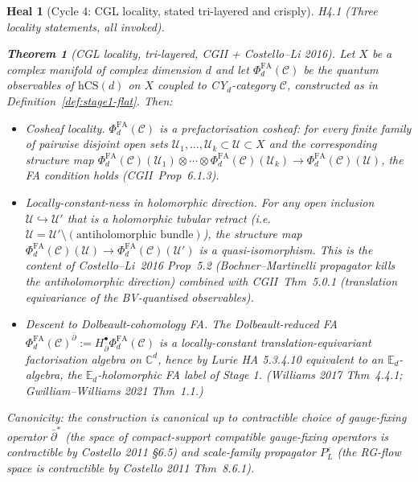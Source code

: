 \documentclass[11pt]{article}
\newtheorem{theorem}{Theorem}
\newtheorem*{heal}{Heal}
\theoremstyle{definition}
\providecommand{\CC}{\mathbb{C}}
\providecommand{\cC}{\mathcal{C}}
\providecommand{\cU}{\mathcal{U}}
\providecommand{\hCS}{\mathrm{hCS}}
\providecommand{\FA}{\mathrm{FA}}
\begin{document}
\begin{heal}[Cycle 4: CGL locality, stated tri-layered and crisply]

\emph{H4.1 (Three locality statements, all invoked).}

\begin{theorem}[CGL locality, tri-layered, CGII + Costello--Li 2016]
\label{thm:cgl-locality}
Let $X$ be a complex manifold of complex dimension $d$ and let
$\Phi^{\FA}_d(\cC)$ be the quantum observables of $\hCS(d)$ on $X$
coupled to CY$_d$-category $\cC$, constructed as in
Definition~\ref{def:stage1-flat}. Then:
\begin{itemize}[leftmargin=2em]
  \item[(L1)] \emph{Cosheaf locality.} $\Phi^{\FA}_d(\cC)$ is a
              prefactorisation cosheaf: for every finite family of
              pairwise disjoint open sets
              $\cU_1,\ldots,\cU_k\subset\cU\subset X$ and the
              corresponding structure map
              $\Phi^{\FA}_d(\cC)(\cU_1) \otimes \cdots \otimes \Phi^{\FA}_d(\cC)(\cU_k)
              \to \Phi^{\FA}_d(\cC)(\cU)$, the FA condition holds
              (CGII~Prop~6.1.3).
  \item[(L2)] \emph{Locally-constant-ness in holomorphic direction.}
              For any open inclusion $\cU\hookrightarrow\cU'$ that is a
              holomorphic tubular retract (i.e.\ $\cU = \cU'\setminus
              (\text{antiholomorphic bundle})$), the structure map
              $\Phi^{\FA}_d(\cC)(\cU) \to \Phi^{\FA}_d(\cC)(\cU')$ is a
              quasi-isomorphism. This is the content of
              Costello--Li~2016 Prop~5.2 (Bochner--Martinelli
              propagator kills the antiholomorphic direction) combined
              with CGII~Thm~5.0.1 (translation equivariance of the
              BV-quantised observables).
  \item[(L3)] \emph{Descent to Dolbeault-cohomology FA.} The
              Dolbeault-reduced FA
              $\Phi^{\FA}_d(\cC)^{\bar\partial} := H^\bullet_{\bar\partial}
              \Phi^{\FA}_d(\cC)$ is a locally-constant
              translation-equivariant factorisation algebra on
              $\CC^d$, hence by Lurie HA 5.3.4.10 equivalent to an
              $\mathbb{E}_d$-algebra, the $\mathbb{E}_d$-holomorphic FA
              label of Stage 1. (Williams 2017 Thm~4.4.1; Gwilliam--Williams
              2021 Thm~1.1.)
\end{itemize}
Canonicity: the construction is canonical up to contractible choice
of gauge-fixing operator $\bar\partial^*$ (the space of
compact-support compatible gauge-fixing operators is contractible by
Costello 2011 \S6.5) and scale-family propagator $P_L^\varepsilon$
(the RG-flow space is contractible by Costello 2011 Thm~8.6.1).
\end{theorem}


\end{heal}
\end{document}
